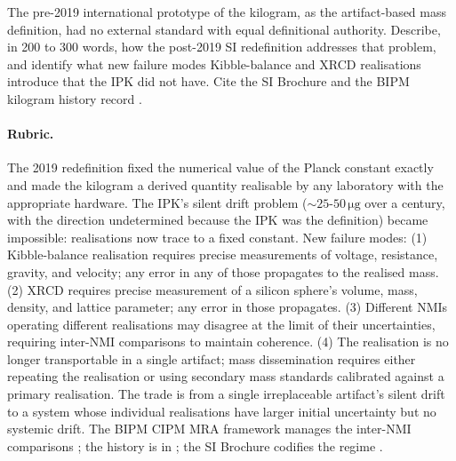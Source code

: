 \begin{exercise}
The pre-2019 international prototype of the kilogram, as the
artifact-based mass definition, had no external standard with equal
definitional authority. Describe, in 200 to 300 words, how the
post-2019 SI redefinition addresses that problem, and identify
what new failure modes Kibble-balance and XRCD realisations
introduce that the IPK did not have. Cite the SI Brochure
\cite{std:bipm-si2019} and the BIPM kilogram history record
\cite{web:bipm-kilogram-history}.

\paragraph{Rubric.} The 2019 redefinition fixed the numerical value
of the Planck constant exactly and made the kilogram a derived
quantity realisable by any laboratory with the appropriate
hardware. The IPK's silent drift problem ($\sim 25$-$50 \,\si{\micro
\gram}$ over a century, with the direction undetermined because
the IPK was the definition) became impossible: realisations now
trace to a fixed constant. New failure modes: (1) Kibble-balance
realisation requires precise measurements of voltage, resistance,
gravity, and velocity; any error in any of those propagates to the
realised mass. (2) XRCD requires precise measurement of a silicon
sphere's volume, mass, density, and lattice parameter; any error
in those propagates. (3) Different NMIs operating different
realisations may disagree at the limit of their uncertainties,
requiring inter-NMI comparisons to maintain coherence. (4) The
realisation is no longer transportable in a single artifact; mass
dissemination requires either repeating the realisation or using
secondary mass standards calibrated against a primary realisation.
The trade is from a single irreplaceable artifact's silent drift
to a system whose individual realisations have larger initial
uncertainty but no systemic drift. The BIPM CIPM MRA framework
manages the inter-NMI comparisons \cite{std:bipm-cipm-mra}; the
history is in \cite{web:bipm-kilogram-history}; the SI Brochure
codifies the regime \cite{std:bipm-si2019}.
\end{exercise}

